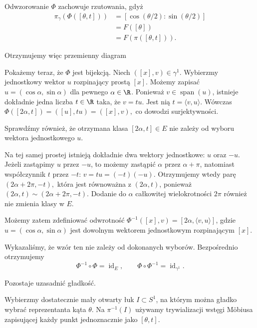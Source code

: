 \begin{przyklad}
Odwzorowanie $\Phi$ zachowuje rzutowania,
gdyż
\[
\begin{aligned}
\pi_\gamma(\Phi([\theta,t]))
&=[\cos(\theta/2):\sin(\theta/2)]\\
&=F([\theta])\\
&=F(\pi([\theta,t])).
\end{aligned}
\]

Otrzymujemy więc przemienny diagram
\begin{center}
\end{center}
Pokażemy teraz, że $\Phi$ jest bijekcją.
Niech
$
([x],v)\in\gamma^1.
$
Wybierzmy jednostkowy wektor $u$
rozpinający prostą $[x]$.
Możemy zapisać
$
u=(\cos\alpha,\sin\alpha)
$
dla pewnego $\alpha\in\R$.
Ponieważ $v\in\operatorname{span}(u)$,
istnieje dokładnie jedna liczba $t\in\R$
taka, że
$
v=tu.
$
Jest nią
$
t=\langle v,u\rangle.
$
Wówczas
$
\Phi([2\alpha,t])
=
([u],tu)
=
([x],v),
$
co dowodzi surjektywności.

Sprawdźmy również, że otrzymana klasa
$[2\alpha,t]\in E$ nie zależy od wyboru
wektora jednostkowego $u$.

Na tej samej prostej istnieją dokładnie
dwa wektory jednostkowe: $u$ oraz $-u$.
Jeżeli zastąpimy $u$ przez $-u$, to możemy
zastąpić $\alpha$ przez $\alpha+\pi$,
natomiast współczynnik $t$ przez $-t$:
$
v=tu=(-t)(-u).
$
Otrzymujemy wtedy parę
$
(2\alpha+2\pi,-t),
$
która jest równoważna z $(2\alpha,t)$,
ponieważ
$
(2\alpha,t)\sim(2\alpha+2\pi,-t).
$
Dodanie do $\alpha$ całkowitej wielokrotności
$2\pi$ również nie zmienia klasy w $E$.

Możemy zatem zdefiniować odwrotność $\Phi^{-1}([x],v) = [2\alpha,\langle v,u\rangle]$,
gdzie $u=(\cos\alpha,\sin\alpha)$
jest dowolnym wektorem jednostkowym
rozpinającym $[x]$.

Wykazaliśmy, że wzór ten nie zależy
od dokonanych wyborów.
Bezpośrednio otrzymujemy
\[
\Phi^{-1}\circ\Phi=\operatorname{id}_E,
\qquad
\Phi\circ\Phi^{-1}=\operatorname{id}_{\gamma^1}.
\]

Pozostaje uzasadnić gładkość.

Wybierzmy dostatecznie mały otwarty łuk
$I\subset S^1$, na którym można gładko
wybrać reprezentanta kąta $\theta$.
Na $\pi^{-1}(I)$ używamy trywializacji
wstęgi Möbiusa zapisującej każdy punkt
jednoznacznie jako $[\theta,t]$.


\end{przyklad}
